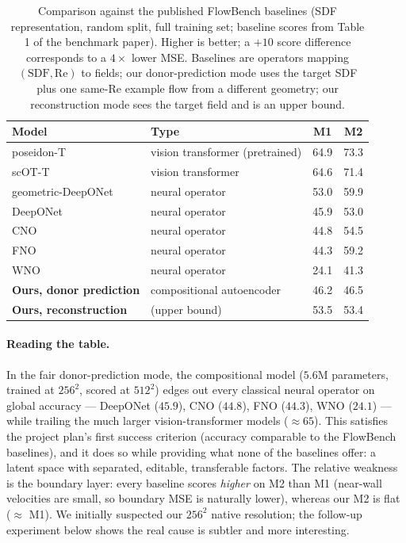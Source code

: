 \documentclass[11pt]{article}
\begin{document}
\begin{table}[htbp]
  \centering
  \caption{Comparison against the published FlowBench baselines (SDF
  representation, random split, full training set; baseline scores from
  Table 1 of the benchmark paper). Higher is better; a $+10$ score
  difference corresponds to a $4\times$ lower MSE. Baselines are
  operators mapping $(\mathrm{SDF}, \mathrm{Re})$ to fields; our
  donor-prediction mode uses the target SDF plus one same-Re example
  flow from a different geometry; our reconstruction mode sees the
  target field and is an upper bound.}
  \label{tab:baselines}
  \begin{tabular}{llcc}
    \toprule
    Model & Type & M1 & M2 \\
    \midrule
    poseidon-T          & vision transformer (pretrained) & 64.9 & 73.3 \\
    scOT-T              & vision transformer              & 64.6 & 71.4 \\
    geometric-DeepONet  & neural operator                 & 53.0 & 59.9 \\
    DeepONet            & neural operator                 & 45.9 & 53.0 \\
    CNO                 & neural operator                 & 44.8 & 54.5 \\
    FNO                 & neural operator                 & 44.3 & 59.2 \\
    WNO                 & neural operator                 & 24.1 & 41.3 \\
    \midrule
    \textbf{Ours, donor prediction} & compositional autoencoder & 46.2 & 46.5 \\
    \textbf{Ours, reconstruction}   & (upper bound)             & 53.5 & 53.4 \\
    \bottomrule
  \end{tabular}
\end{table}

\paragraph{Reading the table.} In the fair donor-prediction mode, the
compositional model ($5.6$M parameters, trained at $256^2$, scored at
$512^2$) edges out every classical neural operator on global accuracy
--- DeepONet ($45.9$), CNO ($44.8$), FNO ($44.3$), WNO ($24.1$) ---
while trailing the much larger vision-transformer models
($\approx 65$). This satisfies the project plan's first success
criterion (accuracy comparable to the FlowBench baselines), and it does
so while providing what none of the baselines offer: a latent space with
separated, editable, transferable factors. The relative weakness is the
boundary layer: every baseline scores \emph{higher} on M2 than M1
(near-wall velocities are small, so boundary MSE is naturally lower),
whereas our M2 is flat ($\approx$ M1). We initially suspected our
$256^2$ native resolution; the follow-up experiment below shows the
real cause is subtler and more interesting.
\end{document}
